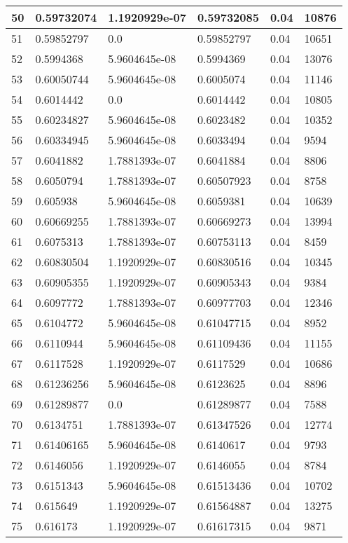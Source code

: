 \begin{longtable}{|l|l|l|l|l|l|}
50 & 0.59732074 & 1.1920929e-07 & 0.59732085 & 0.04 & 10876 \\ \hline 
51 & 0.59852797 & 0.0 & 0.59852797 & 0.04 & 10651 \\ \hline 
52 & 0.5994368 & 5.9604645e-08 & 0.5994369 & 0.04 & 13076 \\ \hline 
53 & 0.60050744 & 5.9604645e-08 & 0.6005074 & 0.04 & 11146 \\ \hline 
54 & 0.6014442 & 0.0 & 0.6014442 & 0.04 & 10805 \\ \hline 
55 & 0.60234827 & 5.9604645e-08 & 0.6023482 & 0.04 & 10352 \\ \hline 
56 & 0.60334945 & 5.9604645e-08 & 0.6033494 & 0.04 & 9594 \\ \hline 
57 & 0.6041882 & 1.7881393e-07 & 0.6041884 & 0.04 & 8806 \\ \hline 
58 & 0.6050794 & 1.7881393e-07 & 0.60507923 & 0.04 & 8758 \\ \hline 
59 & 0.605938 & 5.9604645e-08 & 0.6059381 & 0.04 & 10639 \\ \hline 
60 & 0.60669255 & 1.7881393e-07 & 0.60669273 & 0.04 & 13994 \\ \hline 
61 & 0.6075313 & 1.7881393e-07 & 0.60753113 & 0.04 & 8459 \\ \hline 
62 & 0.60830504 & 1.1920929e-07 & 0.60830516 & 0.04 & 10345 \\ \hline 
63 & 0.60905355 & 1.1920929e-07 & 0.60905343 & 0.04 & 9384 \\ \hline 
64 & 0.6097772 & 1.7881393e-07 & 0.60977703 & 0.04 & 12346 \\ \hline 
65 & 0.6104772 & 5.9604645e-08 & 0.61047715 & 0.04 & 8952 \\ \hline 
66 & 0.6110944 & 5.9604645e-08 & 0.61109436 & 0.04 & 11155 \\ \hline 
67 & 0.6117528 & 1.1920929e-07 & 0.6117529 & 0.04 & 10686 \\ \hline 
68 & 0.61236256 & 5.9604645e-08 & 0.6123625 & 0.04 & 8896 \\ \hline 
69 & 0.61289877 & 0.0 & 0.61289877 & 0.04 & 7588 \\ \hline 
70 & 0.6134751 & 1.7881393e-07 & 0.61347526 & 0.04 & 12774 \\ \hline 
71 & 0.61406165 & 5.9604645e-08 & 0.6140617 & 0.04 & 9793 \\ \hline 
72 & 0.6146056 & 1.1920929e-07 & 0.6146055 & 0.04 & 8784 \\ \hline 
73 & 0.6151343 & 5.9604645e-08 & 0.61513436 & 0.04 & 10702 \\ \hline 
74 & 0.615649 & 1.1920929e-07 & 0.61564887 & 0.04 & 13275 \\ \hline 
75 & 0.616173 & 1.1920929e-07 & 0.61617315 & 0.04 & 9871 \\ \hline 
\end{longtable}